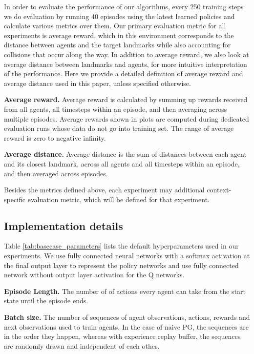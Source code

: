 \documentclass{article}
\begin{document}
In order to evaluate the performance of our algorithms, every 250 training steps we do evaluation by running 40 episodes using the latest learned policies and calculate various metrics over them. Our primary evaluation metric for all experiments is average reward, which in this environment corresponds to the distance between agents and the target landmarks while also accounting for collisions that occur along the way. In addition to average reward, we also look at average distance between landmarks and agents, for more intuitive interpretation of the performance. Here we provide a detailed definition of average reward and average distance used in this paper, unless specified otherwise.

\textbf{Average reward.} Average reward is calculated by summing up rewards received from all agents, all timesteps within an episode, and then averaging across multiple episodes. Average rewards shown in plots are computed during dedicated evaluation runs whose data do not go into training set. The range of average reward is zero to negative infinity. 

\textbf{Average distance.} Average distance is the sum of distances between each agent and its closest landmark, across all agents and all timesteps within an episode, and then averaged across episodes.

Besides the metrics defined above, each experiment may additional context-specific evaluation metric, which will be defined for that experiment.


\subsection{Implementation details}

Table \ref{tab:basecase_parameters} lists the default hyperparameters used in our experiments. We use fully connected neural networks with a softmax activation at the final output layer to represent the policy networks and use fully connected network without output layer activation for the Q networks.

\textbf{Episode Length.} The number of of actions every agent can take from the start state until the episode ends.

\textbf{Batch size.} The number of sequences of agent observations, actions, rewards and next observations used to train agents. In the case of naive PG, the sequences are in the order they happen, whereas with experience replay buffer, the sequences are randomly drawn and independent of each other. 
\end{document}
